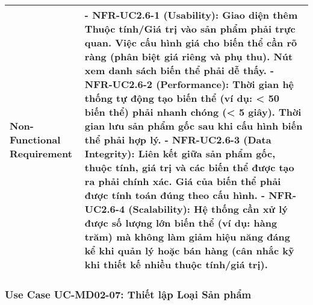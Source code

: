 \begin{longtable}{|m{4cm}|p{11cm}|}
\hline
Non-Functional Requirement & - \textbf{NFR-UC2.6-1 (Usability):} Giao diện thêm Thuộc tính/Giá trị vào sản phẩm phải trực quan. Việc cấu hình giá cho biến thể cần rõ ràng (phân biệt giá riêng và phụ thu). Nút xem danh sách biến thể phải dễ thấy. \newline - \textbf{NFR-UC2.6-2 (Performance):} Thời gian hệ thống tự động tạo biến thể (ví dụ: < 50 biến thể) phải nhanh chóng (< 5 giây). Thời gian lưu sản phẩm gốc sau khi cấu hình biến thể phải hợp lý. \newline - \textbf{NFR-UC2.6-3 (Data Integrity):} Liên kết giữa sản phẩm gốc, thuộc tính, giá trị và các biến thể được tạo ra phải chính xác. Giá của biến thể phải được tính toán đúng theo cấu hình. \newline - \textbf{NFR-UC2.6-4 (Scalability):} Hệ thống cần xử lý được số lượng lớn biến thể (ví dụ: hàng trăm) mà không làm giảm hiệu năng đáng kể khi quản lý hoặc bán hàng (cân nhắc kỹ khi thiết kế nhiều thuộc tính/giá trị). \\
\hline

\end{longtable}

\subsubsection{Use Case UC-MD02-07: Thiết lập Loại Sản phẩm}

